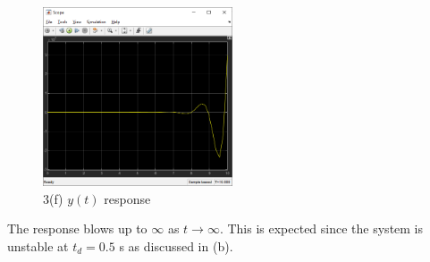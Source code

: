 \subsection{}
\begin{figure}[h]
    \centering
    \includegraphics[width=0.5\textwidth]{Questions/Figures/Q3f.png}
    \caption{3(f) $y(t)$ response}
\end{figure}

The response blows up to $\infty$ as $t \to \infty$. This is expected since the system is unstable at $t_d = 0.5$ s as 
discussed in (b).